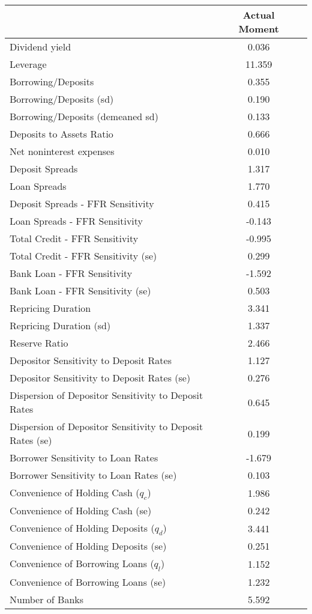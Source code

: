 \begin{tabular*}{\hsize}{@{\hskip\tabcolsep\extracolsep\fill}l*{2}{c}}\hline \hline & {Actual Moment}  &    \\ [1ex] \hline  Dividend yield&0.036&\\
Leverage&11.359&\\
Borrowing/Deposits&0.355&\\
Borrowing/Deposits (sd)&0.190&\\
Borrowing/Deposits (demeaned sd)&0.133&\\
Deposits to Assets Ratio&0.666&\\
Net noninterest expenses&0.010&\\
Deposit Spreads&1.317&\\
Loan Spreads&1.770&\\
Deposit Spreads - FFR Sensitivity&0.415&\\
Loan Spreads - FFR Sensitivity&-0.143&\\
Total Credit - FFR Sensitivity&-0.995&\\
Total Credit - FFR Sensitivity (se)&0.299&\\
Bank Loan - FFR Sensitivity&-1.592&\\
Bank Loan - FFR Sensitivity (se)&0.503&\\
Repricing Duration&3.341&\\
Repricing Duration (sd)&1.337&\\
Reserve Ratio&2.466&\\
Depositor Sensitivity to Deposit Rates&1.127&\\
Depositor Sensitivity to Deposit Rates (se)&0.276&\\
Dispersion of Depositor Sensitivity to Deposit Rates&0.645&\\
Dispersion of Depositor Sensitivity to Deposit Rates (se)&0.199&\\
Borrower Sensitivity to Loan Rates&-1.679&\\
Borrower Sensitivity to Loan Rates (se)&0.103&\\
Convenience of Holding Cash ($q_c$)&1.986&\\
Convenience of Holding Cash (se)&0.242&\\
Convenience of Holding Deposits ($q_d$)&3.441&\\
Convenience of Holding Deposits (se)&0.251&\\
Convenience of Borrowing Loans ($q_l$)&1.152&\\
Convenience of Borrowing Loans (se)&1.232&\\
Number of Banks&5.592&\\
\hline \hline \end{tabular*}
